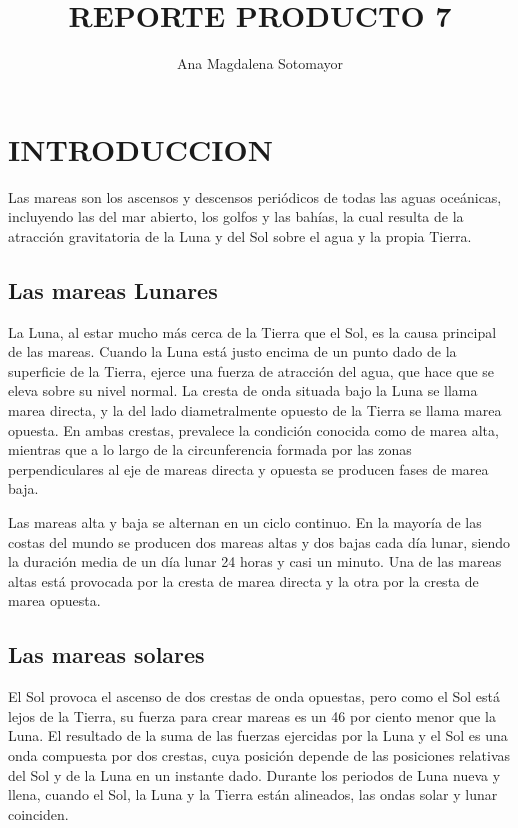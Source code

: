 \documentclass[letterpaper,10pt,twoside,onecolumn]{article}
\begin{document}
 
\title{REPORTE PRODUCTO 7}

\author{Ana Magdalena Sotomayor} 

\maketitle 
\section{INTRODUCCION}
Las mareas son los  ascensos y descensos periódicos de todas las aguas oceánicas, incluyendo las del mar abierto, los golfos y las bahías, la cual resulta de la atracción gravitatoria de la Luna y del Sol sobre el agua y la propia Tierra.
\subsection{Las mareas Lunares}
La Luna, al estar mucho más cerca de la Tierra que el Sol, es la causa principal de las mareas. Cuando la Luna está justo encima de un punto dado de la superficie de la Tierra, ejerce una fuerza de atracción del agua, que hace que se eleva sobre su nivel normal. La cresta de onda situada bajo la Luna se llama marea directa, y la del lado diametralmente opuesto de la Tierra se llama marea opuesta. En ambas crestas, prevalece la condición conocida como de marea alta, mientras que a lo largo de la circunferencia formada por las zonas perpendiculares al eje de mareas directa y opuesta se producen fases de marea baja.

Las mareas alta y baja se alternan en un ciclo continuo. En la mayoría de las costas del mundo se producen dos mareas altas y dos bajas cada día lunar, siendo la duración media de un día lunar 24 horas y casi un minuto. Una de las mareas altas está provocada por la cresta de marea directa y la otra por la cresta de marea opuesta.
\subsection{Las mareas solares}
El Sol provoca el ascenso de dos crestas de onda opuestas, pero como el Sol está lejos de la Tierra, su fuerza para crear mareas es un 46 por ciento menor que la Luna. El resultado de la suma de las fuerzas ejercidas por la Luna y el Sol es una onda compuesta por dos crestas, cuya posición depende de las posiciones relativas del Sol y de la Luna en un instante dado. Durante los periodos de Luna nueva y llena, cuando el Sol, la Luna y la Tierra están alineados, las ondas solar y lunar coinciden.
\end{document}
